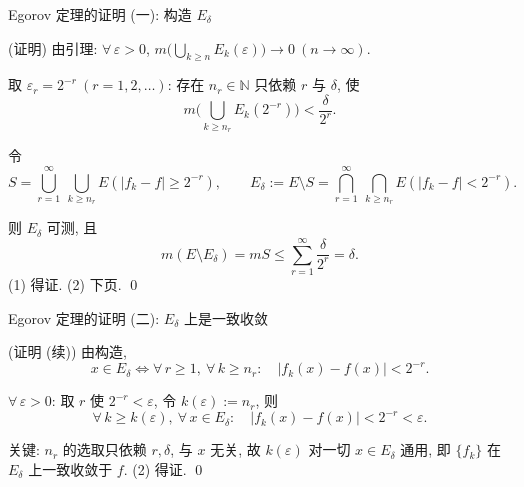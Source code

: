 \begin{frame}{Egorov 定理的证明 (一): 构造 $E_\delta$}

\startproof[bg=yellow, fg=red](证明)
由引理: $\forall\, \varepsilon > 0$, $m\big(\bigcup_{k \geqslant n} E_k(\varepsilon)\big) \to 0\ (n \to \infty)$.

取 $\varepsilon_r = 2^{-r}\ (r = 1, 2, \ldots)$: 存在 $n_r \in \mathbb{N}$ \alert{只依赖 $r$ 与 $\delta$}, 使
\[
m\Big(\bigcup_{k \geqslant n_r} E_k(2^{-r})\Big) < \frac{\delta}{2^r}.
\]

\pause

令
\[
S = \bigcup_{r=1}^{\infty}\ \bigcup_{k \geqslant n_r} E(|f_k - f| \geqslant 2^{-r}),
\qquad
E_\delta := E \setminus S = \bigcap_{r=1}^{\infty}\ \bigcap_{k \geqslant n_r} E(|f_k - f| < 2^{-r}).
\]

\pause

则 $E_\delta$ 可测, 且
\[
m(E \setminus E_\delta) = mS
\leqslant \sum_{r=1}^{\infty} \frac{\delta}{2^r} = \delta .
\]
(1) 得证. (2) 下页.
\qed

\end{frame}


\begin{frame}{Egorov 定理的证明 (二): $E_\delta$ 上是一致收敛}

\startproof[bg=yellow, fg=red](证明 (续))
由构造,
\[
x \in E_\delta
\iff
\forall\, r \geqslant 1,\ \forall\, k \geqslant n_r:\quad |f_k(x) - f(x)| < 2^{-r}.
\]

\pause

$\forall\, \varepsilon > 0$: 取 $r$ 使 $2^{-r} < \varepsilon$, 令 $k(\varepsilon) := n_r$, 则
\[
\forall\, k \geqslant k(\varepsilon),\ \forall\, x \in E_\delta:\quad
|f_k(x) - f(x)| < 2^{-r} < \varepsilon .
\]

\pause

关键: $n_r$ 的选取只依赖 $r, \delta$, \alert{与 $x$ 无关}, 故 $k(\varepsilon)$ 对一切 $x \in E_\delta$ 通用, 即 $\{f_k\}$ 在 $E_\delta$ 上\alert{一致}收敛于 $f$. (2) 得证.
\qed

\end{frame}


